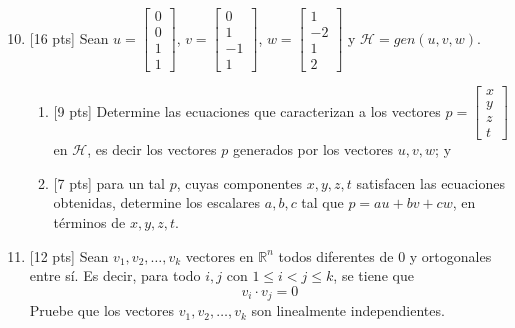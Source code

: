 \documentclass[11pt]{article}
\begin{document}
\begin{enumerate}
\setcounter{enumi}{9}
\item{}[16 pts] Sean $u = \begin{bmatrix}0\\0\\1\\1\end{bmatrix}$, $v = \begin{bmatrix}0\\1\\-1\\1\end{bmatrix}$, $w = \begin{bmatrix}1\\-2\\1\\2\end{bmatrix}$ y $\mathcal{H} = gen(u,v,w)$.
\begin{enumerate}
\item{}[9 pts] Determine las ecuaciones que caracterizan a los vectores $p = \begin{bmatrix}x\\y\\z\\t\end{bmatrix}$ en $\mathcal{H}$, es decir los vectores $p$ generados por los vectores $u,v,w$; y

\vspace{4cm}

\item{}[7 pts] para un tal $p$, cuyas componentes $x,y,z,t$ satisfacen las ecuaciones obtenidas, determine los escalares $a,b,c$ tal que $p=au+bv+cw$, en términos de $x,y,z,t$.

\vspace{5cm}
\end{enumerate}

\item{}[12 pts] Sean $v_1,v_2,\dots,v_k$ vectores en $\mathbb{R}^n$ todos diferentes de $0$ y ortogonales entre sí. Es decir, para todo $i,j$ con $1\leq i<j\leq k$, se tiene que
\[
v_i\cdot v_j = 0
\]
Pruebe que los vectores $v_1,v_2,\dots,v_k$ son linealmente independientes.

\vspace{5cm}


\end{enumerate}
\end{document}
